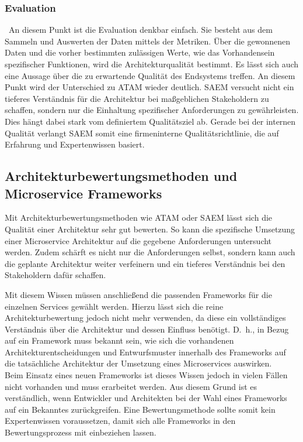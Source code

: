\subsubsection{Evaluation}
\
An diesem Punkt ist die Evaluation denkbar einfach. Sie besteht aus dem Sammeln und Auswerten der Daten mittels der Metriken. Über die gewonnenen Daten und die vorher bestimmten zulässigen Werte, wie das Vorhandensein spezifischer Funktionen, wird die Architekturqualität bestimmt. Es lässt sich auch eine Aussage über die zu erwartende Qualität des Endsystems treffen.
An diesem Punkt wird der Unterschied zu \ac{ATAM} wieder deutlich. \ac{SAEM} versucht nicht ein tieferes Verständnis für die Architektur bei maßgeblichen Stakeholdern zu schaffen, sondern nur die Einhaltung spezifischer Anforderungen zu gewährleisten. Dies hängt dabei stark vom definiertem Qualitätsziel ab. Gerade bei der internen Qualität verlangt \ac{SAEM} somit eine firmeninterne Qualitätsrichtlinie\cite{IEEE_TSE2002}, die auf Erfahrung und Expertenwissen basiert.

\subsection{Architekturbewertungsmethoden und Microservice Frameworks}

Mit Architekturbewertungsmethoden wie \ac{ATAM} oder \ac{SAEM} lässt sich die Qualität einer Architektur sehr gut bewerten. So kann die spezifische Umsetzung einer Microservice Architektur auf die gegebene Anforderungen untersucht werden. Zudem schärft es nicht nur die Anforderungen selbst, sondern kann auch die geplante Architektur weiter verfeinern und ein tieferes Verständnis bei den Stakeholdern dafür schaffen.

Mit diesem Wissen müssen anschließend die passenden Frameworks für die einzelnen Services gewählt werden. Hierzu lässt sich die reine Architekturbewertung jedoch nicht mehr verwenden, da diese ein vollständiges Verständnis über die Architektur und dessen Einfluss benötigt. D.~h., in Bezug auf ein Framework muss bekannt sein, wie sich die vorhandenen Architekturentscheidungen und Entwurfsmuster innerhalb des Frameworks auf die tatsächliche Architektur der Umsetzung eines Microservices auswirken.\\
Beim Einsatz eines neuen Frameworks ist dieses Wissen jedoch in vielen Fällen nicht vorhanden und muss erarbeitet werden. Aus diesem Grund ist es verständlich, wenn Entwickler und Architekten bei der Wahl eines Frameworks auf ein Bekanntes zurückgreifen. Eine Bewertungsmethode sollte somit kein Expertenwissen voraussetzen, damit sich alle Frameworks in den Bewertungsprozess mit einbeziehen lassen.

